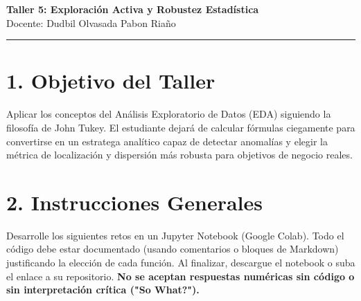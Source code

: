 \documentclass[12pt,a4paper]{article}
\begin{document}
\begin{center}
    {\huge \textcolor{unabblue}{\textbf{Taller 5: Exploración Activa y Robustez Estadística}}} \\[0.5cm]
    {\large Docente: Dudbil Olvasada Pabon Riaño} \\[0.2cm]
    \rule{\textwidth}{1pt}
\end{center}

\vspace{0.5cm}

\section*{\textcolor{unabblue}{1. Objetivo del Taller}}
Aplicar los conceptos del Análisis Exploratorio de Datos (EDA) siguiendo la filosofía de John Tukey. El estudiante dejará de calcular fórmulas ciegamente para convertirse en un estratega analítico capaz de detectar anomalías y elegir la métrica de localización y dispersión más robusta para objetivos de negocio reales.

\section*{\textcolor{unabblue}{2. Instrucciones Generales}}
Desarrolle los siguientes retos en un Jupyter Notebook (Google Colab). Todo el código debe estar documentado (usando comentarios o bloques de Markdown) justificando la elección de cada función. Al finalizar, descargue el notebook o suba el enlace a su repositorio. \textbf{No se aceptan respuestas numéricas sin código o sin interpretación crítica ("So What?").}

\vspace{0.5cm}
\noindent{}
\vspace{0.5cm}
\end{document}
